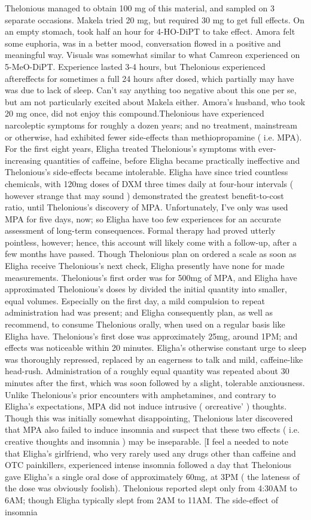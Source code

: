 \documentclass[12pt]{book}
\begin{document}
Thelonious managed to obtain 100 mg of this material, and sampled on 3 separate occasions. Makela tried 20 mg, but required 30 mg to get full effects. On an empty stomach, took half an hour for 4-HO-DiPT to take effect. Amora felt some euphoria, was in a better mood, conversation flowed in a positive and meaningful way. Visuals was somewhat similar to what Camreon experienced on 5-MeO-DiPT. Experience lasted 3-4 hours, but Thelonious experienced aftereffects for sometimes a full 24 hours after dosed, which partially may have was due to lack of sleep. Can't say anything too negative about this one per se, but am not particularly excited about Makela either. Amora's husband, who took 20 mg once, did not enjoy this compound.Thelonious have experienced narcoleptic symptoms for roughly a dozen years; and no treatment, mainstream or otherwise, had exhibited fewer side-effects than methiopropamine ( i.e. MPA). For the first eight years, Eligha treated Thelonious's symptoms with ever-increasing quantities of caffeine, before Eligha became practically ineffective and Thelonious's side-effects became intolerable. Eligha have since tried countless chemicals, with 120mg doses of DXM three times daily at four-hour intervals ( however strange that may sound ) demonstrated the greatest benefit-to-cost ratio, until Thelonious's discovery of MPA. Unfortunately, I've only was used MPA for five days, now; so Eligha have too few experiences for an accurate assessment of long-term consequences. Formal therapy had proved utterly pointless, however; hence, this account will likely come with a follow-up, after a few months have passed. Though Thelonious plan on ordered a scale as soon as Eligha receive Thelonious's next check, Eligha presently have none for made measurements. Thelonious's first order was for 500mg of MPA, and Eligha have approximated Thelonious's doses by divided the initial quantity into smaller, equal volumes. Especially on the first day, a mild compulsion to repeat administration had was present; and Eligha consequently plan, as well as recommend, to consume Thelonious orally, when used on a regular basis like Eligha have. Thelonious's first dose was approximately 25mg, around 1PM; and effects was noticeable within 20 minutes. Eligha's otherwise constant urge to sleep was thoroughly repressed, replaced by an eagerness to talk and mild, caffeine-like head-rush. Administration of a roughly equal quantity was repeated about 30 minutes after the first, which was soon followed by a slight, tolerable anxiousness. Unlike Thelonious's prior encounters with amphetamines, and contrary to Eligha's expectations, MPA did not induce intrusive ( orcreative' ) thoughts. Though this was initially somewhat disappointing, Thelonious later discovered that MPA also failed to induce insomnia and suspect that these two effects ( i.e. creative thoughts and insomnia ) may be inseparable. [I feel a needed to note that Eligha's girlfriend, who very rarely used any drugs other than caffeine and OTC painkillers, experienced intense insomnia followed a day that Thelonious gave Eligha's a single oral dose of approximately 60mg, at 3PM ( the lateness of the dose was obviously foolish). Thelonious reported slept only from 4:30AM to 6AM; though Eligha typically slept from 2AM to 11AM. The side-effect of insomnia 
\end{document}
